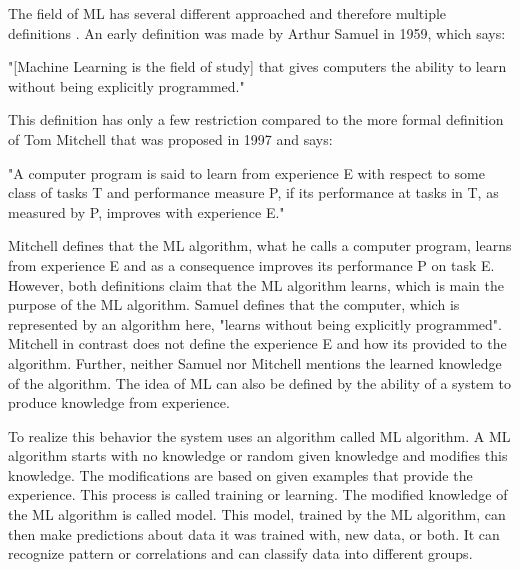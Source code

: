The field of \ac{ML} has several different approached and therefore multiple definitions \cite{Wikipedia2017MachineLearning}.
An early definition was made by Arthur Samuel in 1959, which says:

"[Machine Learning is the field of study] that gives computers the ability to learn without being explicitly programmed." \cite{Samuel1959SomeCheckers}

This definition has only a few restriction compared to the more formal definition of Tom Mitchell that was proposed in 1997 and says:

"A computer program is said to learn from experience E with respect to some class of tasks T and performance measure P, if its performance at tasks in T, as measured by P, improves with experience E." \cite{Mitchell1997MachineLearning}

Mitchell defines that the \ac{ML} algorithm, what he calls a computer program, learns from experience E and as a consequence improves its performance P on task E. %
However, both definitions claim that the \ac{ML} algorithm learns, which is main the purpose of the \ac{ML} algorithm.
Samuel defines that the computer, which is represented by an algorithm here, "learns without being explicitly programmed".
Mitchell in contrast does not define the experience E and how its provided to the algorithm. %
Further, neither Samuel nor Mitchell mentions the learned knowledge of the algorithm.
The idea of \acf{ML} can also be defined by the ability of a system to produce knowledge from experience.

To realize this behavior the system uses an algorithm called \ac{ML} algorithm.
A \ac{ML} algorithm starts with no knowledge or random given knowledge and modifies this knowledge.
The modifications are based on given examples that provide the experience. 
This process is called training or learning. %
The modified knowledge of the \ac{ML} algorithm is called model.
This model, trained by the \ac{ML} algorithm, can then make predictions about data it was trained with, new data, or both.
It can recognize pattern or correlations and can classify data into different groups.


